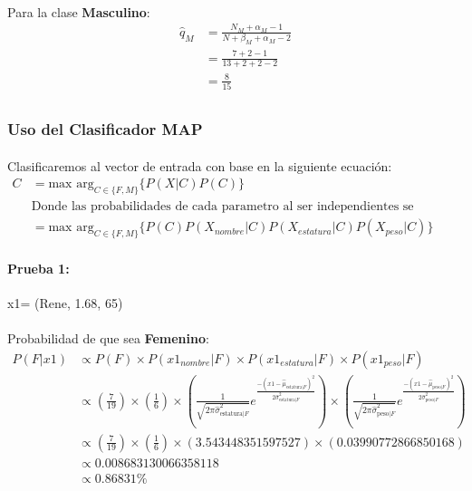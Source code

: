 \documentclass[12pt]{article}
\begin{document}
\paragraph{}Para la clase \textbf{Masculino}:
\begin{equation}
\begin{split}
\hat{q}_M &= \frac{N_M + \alpha_M - 1}{N + \beta_M + \alpha_M - 2}\\
&= \frac{7 + 2 - 1}{13 + 2 + 2 - 2}\\
&= \frac{8}{15}\\
\end{split}
\end{equation}
\clearpage
\pagebreak
\subsubsection{Uso del Clasificador MAP}
\paragraph{} Clasificaremos al vector de entrada con base en la siguiente ecuación:
\begin{equation}
\begin{split}
C &= \text{max arg}_{C\in\{F,M\}} \{ P(X|C)P(C)\} \\
&\text{Donde las probabilidades de cada parametro al ser independientes se multiplicaran}\\
&= \text{max arg}_{C\in\{F,M\}} \{ P(C) P(X_{nombre}|C)P(X_{estatura}|C)P(X_{peso}|C)\}
\end{split}
\end{equation}
\paragraph{Prueba 1: }x1= (Rene, 1.68, 65)
\paragraph{}Probabilidad de que sea \textbf{Femenino}:\\
\begin{equation}
\begin{split}
P(F|x1) &\propto P(F) \times P(x1_{nombre}|F) \times P(x1_{estatura}|F) \times P(x1_{peso}|F) \\
&\propto (\frac{7}{19}) \times (\frac{1}{6}) \times (\frac{1}{\sqrt{2\pi\hat{\sigma}_{\text{estatura}|F}^2}}e^{\frac{-(x1 - \hat{\mu}_{\text{estatura}|F})^2}{2\hat{\sigma}_{\text{estatura}|F}^2}}) \times (\frac{1}{\sqrt{2\pi\hat{\sigma}_{\text{peso}|F}^2}}e^{\frac{-(x1 - \hat{\mu}_{\text{peso}|F})^2}{2\hat{\sigma}_{\text{peso}|F}^2}}) \\
&\propto (\frac{7}{19}) \times (\frac{1}{6}) \times (3.543448351597527) \times (0.03990772866850168) \\
&\propto 0.008683130066358118 \\
&\propto 0.86831\% \\
\end{split}
\end{equation}
\end{document}
